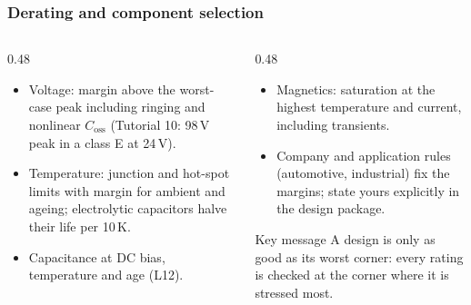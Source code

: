 \begin{frame}
	\frametitle{Derating and component selection}
	\begin{columns}[T]
		\begin{column}{0.48\textwidth}
			\small
			\begin{itemize}
				\item Voltage: margin above the worst-case peak including ringing and nonlinear $C_\mathrm{oss}$ (Tutorial 10: 98\,V peak in a class E at 24\,V).
				\item Temperature: junction and hot-spot limits with margin for ambient and ageing; electrolytic capacitors halve their life per 10\,K.
				\item Capacitance at DC bias, temperature and age (L12).
			\end{itemize}
		\end{column}
		\begin{column}{0.48\textwidth}
			\small
			\begin{itemize}
				\item Magnetics: saturation at the highest temperature and current, including transients.
				\item Company and application rules (automotive, industrial) fix the margins; state yours explicitly in the design package.
			\end{itemize}
			\begin{block}{Key message}
				A design is only as good as its worst corner: every rating is checked at the corner where it is stressed most.
			\end{block}
		\end{column}
	\end{columns}
\end{frame}

